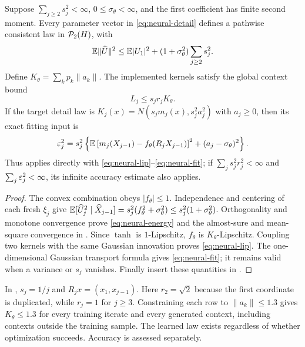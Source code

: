 \begin{theorem}\label{thm:spectral-network}
Suppose $\sum_{j\ge2}s_j^2<\infty$, $0\le\sigma_\theta<\infty$, and the first coefficient has finite second moment. Every parameter vector in \eqref{eq:neural-detail} defines a pathwise consistent law in $\mathcal P_2(H)$, with
\begin{equation}\label{eq:neural-energy}
 \mathbb E\|\widehat U\|^2\le\mathbb E|U_1|^2+
 (1+\sigma_\theta^2)\sum_{j\ge2}s_j^2.
\end{equation}
Define $K_\theta=\sum_kp_k\|a_k\|$. The implemented kernels satisfy the global context bound
\begin{equation}\label{eq:neural-lip}
 L_j\le s_jr_jK_\theta.
\end{equation}
If the target detail law is
$K_j(x)=N(s_jm_j(x),s_j^2a_j^2)$ with $a_j\ge0$, then its exact fitting input is
\begin{equation}\label{eq:neural-fit}
 \varepsilon_j^2=s_j^2\left\{\mathbb E\left[m_j(X_{j-1})-
 f_\theta(R_jX_{j-1})\right]^2+(a_j-\sigma_\theta)^2\right\}.
\end{equation}
Thus  applies directly with \eqref{eq:neural-lip}--\eqref{eq:neural-fit}; if $\sum_js_j^2r_j^2<\infty$ and $\sum_j\varepsilon_j^2<\infty$, its infinite accuracy estimate also applies.
\end{theorem}
\begin{proof}
The convex combination obeys $|f_\theta|\le1$. Independence and centering of each fresh $\xi_j$ give
$\mathbb E[\widehat U_j^2\mid\widehat X_{j-1}]
=s_j^2(f_\theta^2+\sigma_\theta^2)\le s_j^2(1+\sigma_\theta^2)$.
Orthogonality and monotone convergence prove \eqref{eq:neural-energy} and the almost-sure and mean-square convergence in .
Since $\tanh$ is $1$-Lipschitz, $f_\theta$ is $K_\theta$-Lipschitz. Coupling two kernels with the same Gaussian innovation proves \eqref{eq:neural-lip}. The one-dimensional Gaussian transport formula gives \eqref{eq:neural-fit}; it remains valid when a variance or $s_j$ vanishes. Finally insert these quantities in .
\end{proof}

In , $s_j=1/j$ and $R_jx=(x_1,x_{j-1})$. Here $r_2=\sqrt2$ because the first coordinate is duplicated, while $r_j=1$ for $j\ge3$. Constraining each row to $\|a_k\|\le1.3$ gives $K_\theta\le1.3$ for every training iterate and every generated context, including contexts outside the training sample. The learned law exists regardless of whether optimization succeeds. Accuracy is assessed separately.


